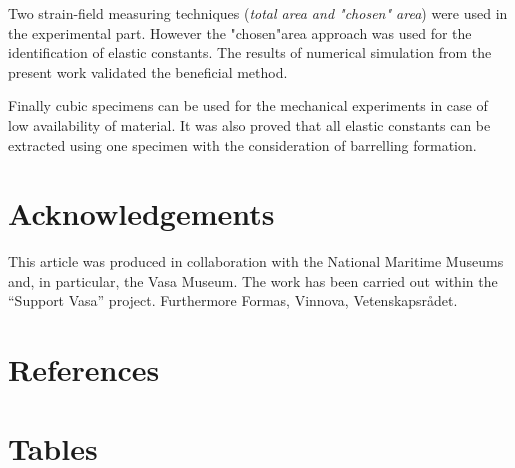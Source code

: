 \documentclass[review]{elsarticle}
\begin{document}
Two strain-field measuring techniques (\textit{total area and "chosen" area}) were used in the experimental part. However the "chosen"area approach was used for the identification of elastic constants. The results of numerical simulation from the present work validated the beneficial method.\par
Finally cubic specimens can be used for the mechanical experiments in case of low
availability of material. It was also proved that all elastic constants can be extracted using one specimen with the consideration of barrelling formation.


\section*{Acknowledgements}
This article was produced in collaboration with the National Maritime Museums
and, in particular, the Vasa Museum. The work has been carried
out within the ``Support Vasa'' project. Furthermore  Formas, Vinnova,
Vetenskapsr{\aa}det. \section*{References}



\pagebreak
\section*{Tables}
\end{document}
